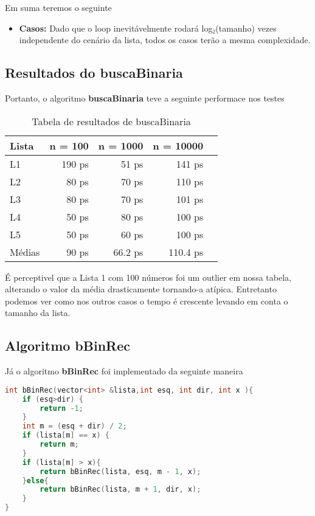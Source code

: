 Em suma teremos o seguinte

\begin{itemize}
	\item \textbf{Casos:} Dado que o loop inevitávelmente rodará log₂(tamanho) vezes independente do cenário da lista, todos os casos terão a mesma complexidade.
 
\end{itemize}

\subsection{Resultados do buscaBinaria}

Portanto, o algoritmo \textbf{buscaBinaria} teve a seguinte performace nos testes

\begin{table}[h!]
	\centering
	\caption{Tabela de resultados de buscaBinaria}
	\label{tab:busc_bin_result}
	\begin{tabular}{lrrrr}
		\toprule
		Lista   & n = 100   & n = 1000  & n = 10000 \\
		\midrule
		L1      & 190 ps    & 51 ps    & 141 ps  \\
		L2      & 80 ps    & 70 ps    & 110 ps  \\
		L3      & 80 ps    & 70 ps    & 101 ps  \\
		L4      & 50 ps    & 80 ps    & 100 ps  \\
		L5      & 50 ps    & 60 ps    & 100 ps  \\
		\midrule
		Médias  & 90 ps  & 66.2 ps  & 110.4 ps \\
		\bottomrule
	\end{tabular}
\end{table}

É perceptivel que a Lista 1 com 100 números foi um outlier em nossa tabela, alterando o valor da média drasticamente tornando-a atípica. Entretanto podemos ver como nos outros casos o tempo é crescente levando em conta o tamanho da lista.

\subsection{Algoritmo bBinRec}

Já o algoritmo \textbf{bBinRec} foi implementado da seguinte maneira 

\begin{lstlisting}[language=C++]
int bBinRec(vector<int> &lista,int esq, int dir, int x ){
    if (esq>dir) {
        return -1;
    }
    int m = (esq + dir) / 2;
    if (lista[m] == x) {
        return m;
    }
    if (lista[m] > x){
        return bBinRec(lista, esq, m - 1, x);
    }else{
        return bBinRec(lista, m + 1, dir, x);
    }
}
\end{lstlisting}

